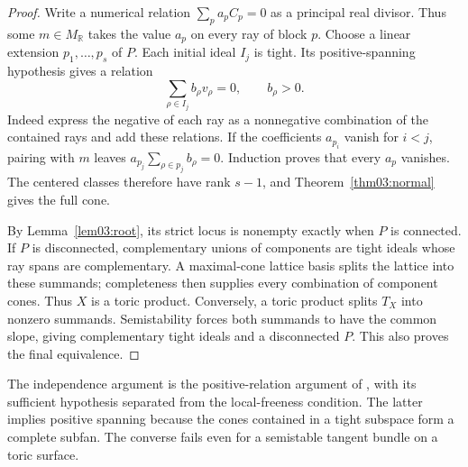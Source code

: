 \documentclass[11pt]{amsart}
\theoremstyle{definition}
\theoremstyle{remark}
\newcommand{\RR}{\mathbb R}
\begin{document}
\begin{proof}
Write a numerical relation $\sum_p a_pC_p=0$ as a principal real
divisor. Thus some $m\in M_\RR$ takes the value $a_p$ on every ray
of block $p$. Choose a linear extension $p_1,\ldots,p_s$ of $P$.
Each initial ideal $I_j$ is tight. Its positive-spanning hypothesis
gives a relation
\[
 \sum_{\rho\in I_j}b_\rho v_\rho=0,\qquad b_\rho>0.
\]
Indeed express the negative of each ray as a nonnegative combination
of the contained rays and add these relations. If the coefficients
$a_{p_i}$ vanish for $i<j$, pairing with $m$ leaves
$a_{p_j}\sum_{\rho\in p_j}b_\rho=0$. Induction proves that every
$a_p$ vanishes. The centered classes therefore have rank $s-1$,
and Theorem~\ref{thm03:normal} gives the full cone.

By Lemma~\ref{lem03:root}, its strict locus is nonempty exactly when
$P$ is connected. If $P$ is disconnected, complementary unions of
components are tight ideals whose ray spans are complementary.
A maximal-cone lattice basis splits the lattice into these summands;
completeness then supplies every combination of component cones.
Thus $X$ is a toric product. Conversely, a toric product splits $T_X$
into nonzero summands. Semistability forces both summands to have the
common slope, giving complementary tight ideals and a disconnected
$P$. This also proves the final equivalence.
\end{proof}

The independence argument is the positive-relation argument of
\cite{wuebben2026toricchambers}, with its sufficient hypothesis
separated from the local-freeness condition. The latter implies
positive spanning because the cones contained in a tight subspace
form a complete subfan. The converse fails even for a semistable
tangent bundle on a toric surface.
\end{document}
